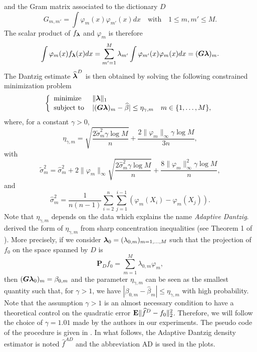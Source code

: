 and the Gram matrix associated to the dictionary $D$
\begin{equation}
    G_{m,m'}=\int\varphi_m(x)\varphi_{m'}(x)dx \quad \text{with}\quad 1\leq m,m' \leq M.
\end{equation}
The scalar product of $f_{\boldsymbol \lambda}$ and $\varphi_m$ is therefore
\begin{equation}
    \int\varphi_m(x)f_{\boldsymbol \lambda}(x)dx = \sum_{m'=1}^M\lambda_{m'}\int\varphi_{m'}(x)\varphi_m(x)dx = (\boldsymbol G\boldsymbol \lambda)_m.
\end{equation}
The Dantzig estimate $\widehat{\boldsymbol \lambda}^D$ is then obtained by solving the following constrained minimization problem
\begin{equation*}
    \left\{
    \begin{array}{ll}
        \text{minimize}\, &\|\boldsymbol \lambda\|_1 \\
        \text{subject to}\, &|(\boldsymbol G\boldsymbol \lambda)_m-\widehat\beta|\leq \eta_{\gamma,m} \quad m\in \{1,\dots,M\},
    \end{array} \right.
\end{equation*}
where, for a constant $\gamma > 0$,
\begin{equation}
    \eta_{\gamma,m} = \sqrt{\frac{2\tilde\sigma_m^2\gamma\log{M}}{n}}+ \frac{2\|\varphi_m\|_{\infty}\gamma\log{M}}{3n},
\end{equation}
with
\begin{equation}
    \tilde\sigma_m^2 = \hat\sigma_m^2+2\|\varphi_m \|_{\infty}\sqrt{\frac{2\hat\sigma_m^2\gamma\log{M}}{n}}+ \frac{8\|\varphi_m\|_{\infty}^2\gamma\log{M}}{n},
\end{equation}
and
\begin{equation}
    \hat\sigma^2_m = \frac{1}{n(n-1)}\sum_{i=2}^n\sum_{j=1}^{i-1}(\varphi_m(X_i)-\varphi_m(X_j)).
\end{equation}
Note that $\eta_{\gamma,m}$ depends on the data which explains the name \textit{Adaptive Dantzig}. \citep{Bertin} derived the form of $\eta_{\gamma,m}$ from sharp concentration inequalities (see Theorem 1 of \citep{Bertin}). More precisely, if we consider $\boldsymbol \lambda_0=(\lambda_{0,m})_{m=1,\dots,M}$ such that the projection of $f_0$ on the space spanned by $D$ is
\begin{equation}
    \textbf{P}_{D}f_0=\sum_{m=1}^M\lambda_{0,m}\varphi_m,
\end{equation}
then $(\boldsymbol G\boldsymbol \lambda_0)_m=\beta_{0,m}$ and the parameter $\eta_{\gamma,m}$ can be seen as the smallest quantity such that, for $\gamma > 1$, we have $|\beta_{0,m}-\hat\beta_m|\leq \eta_{\gamma,m}$ with high probability. Note that the assumption $\gamma > 1$ is an almost necessary condition to have a theoretical control on the quadratic error $\mathbf E\|\widehat f^D-f_0 \|^2_2$. Therefore, we will follow the choice of $\gamma=1.01$ made by the authors in our experiments. The pseudo code of the procedure is given in . In what follows, the Adaptive Dantzig density estimator is noted $\hat f ^{AD}$ and the abbreviation AD is used in the plots.

